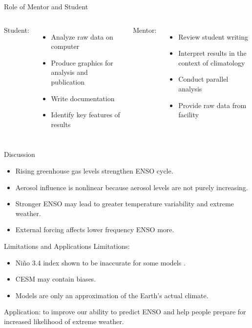 \documentclass[aspectratio=1610]{beamer}
\begin{document}
\begin{frame}{Role of Mentor and Student}
  \begin{columns}[t]
    Student:
    \begin{itemize}
    \item Analyze raw data on computer
    \item Produce graphics for analysis and publication
    \item Write documentation
    \item Identify key features of results
    \end{itemize}
    Mentor:
    \begin{itemize}
    \item Review student writing
    \item Interpret results in the context of climatology
    \item Conduct parallel analysis
    \item Provide raw data from facility
    \end{itemize}
  \end{columns}
\end{frame}

\begin{frame}{Discussion}
  \begin{itemize}
  \item Rising greenhouse gas levels strengthen ENSO cycle.
  \item Aerosol influence is nonlinear because aerosol levels are not purely increasing.
  \item Stronger ENSO may lead to greater temperature variability and extreme weather.
  \item External forcing affects lower frequency ENSO more.
  \end{itemize}
\end{frame}

\begin{frame}{Limitations and Applications}
  Limitations:
  \begin{itemize}
  \item Niño 3.4 index shown to be inaccurate for some models \citep{cai2018increased}.
  \item CESM may contain biases.
  \item Models are only an approximation of the Earth's actual climate.
  \end{itemize}
  Application: to improve our ability to predict ENSO and help people prepare for increased likelihood of extreme weather.
\end{frame}
\end{document}
